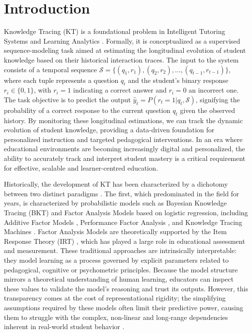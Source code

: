 \documentclass[applsci,article,submit,moreauthors,pdftex]{Definitions/mdpi}
\begin{document}


\section{Introduction} \label{sec_intro}

Knowledge Tracing (KT) \citep{corbett1994knowledge} is a foundational problem in  Intelligent Tutoring Systems and Learning Analytics \citep{Romero2020}. Formally, it is conceptualized as a supervised sequence-modeling task aimed at estimating the longitudinal evolution of student knowledge based on their historical interaction traces. The input to the system consists of a temporal sequence $\mathcal{S} = \{(q_1, r_1), (q_2, r_2), \dots, (q_{t-1}, r_{t-1})\}$, where each tuple represents a question $q_i$ and the student's binary response $r_i \in \{0, 1\}$, with $r_i = 1$ indicating a correct answer and $r_i = 0$ an incorrect one. The task objective is to predict the output $\hat{y}_t = P(r_t=1 | q_t, \mathcal{S})$, signifying the probability of a correct response to the current question $q_t$ given the observed history. By monitoring these longitudinal estimations, we can track the dynamic evolution of student knowledge, providing a data-driven foundation for personalized instruction and targeted pedagogical interventions. In an era where educational environments are becoming increasingly digital and personalized, the ability to accurately track and interpret student mastery is a critical requirement for effective, scalable and learner-centred education.

Historically, the development of KT has been characterized by a dichotomy between two distinct paradigms \citep{abdelrahman2023knowledge}. The first, which predominated in the field for years, is characterized by probabilistic models such as Bayesian Knowledge Tracing (BKT) \citep{corbett1994knowledge} and Factor Analysis Models based on logistic regression, including Additive Factor Models \citep{cen2008comparing}, Performance Factor Analysis \citep{pavlik2009performance}, and Knowledge Tracing Machines \citep{vie2019knowledge}. Factor Analysis Models are theoretically supported by the Item Response Theory (IRT) \citep{embretson2013item}, which has played a large role in educational assessment and measurement. These traditional approaches are intrinsically interpretable: they model learning as a process governed by explicit parameters related to pedagogical, cognitive or psychometric principles. Because the model structure mirrors a theoretical understanding of human learning, educators can inspect these values to validate the model's reasoning and trust its outputs. However, this transparency comes at the cost of representational rigidity; the simplifying assumptions required by these models often limit their predictive power, causing them to struggle with the complex, non-linear and long-range dependencies inherent in real-world student behavior \citep{twenty_five_years_of_bkt}.
\end{document}
